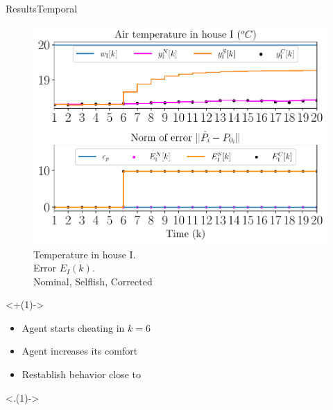 \documentclass[aspectratio=169]{beamer}
\begin{document}
\begin{frame}{Results}{Temporal}
  \centering
  \begin{minipage}[t]{.45\linewidth}
    \begin{figure}[h]
      \centering
      \includegraphics[width=1.\textwidth]{../img/resilient_eq/ErrorWX_command_normErrH.pdf}
      \caption*{Temperature in house I. \\Error $E_{I}(k)$.\\ {} Nominal, {} Selflish, {} Corrected}
    \end{figure}
  \end{minipage}
  \only<+(1)->{
    \begin{minipage}[t]{.50\linewidth}
      \begin{itemize}[<+(1)->]
        \item Agent starts cheating in $k=6$
        \item[\encircle{S}]  Agent increases its comfort
        \item[\encircle{C}] Restablish behavior close to 
      \end{itemize}

      \only<.(1)->{
        \centering
      }


\end{minipage}}
\end{frame}
\end{document}
